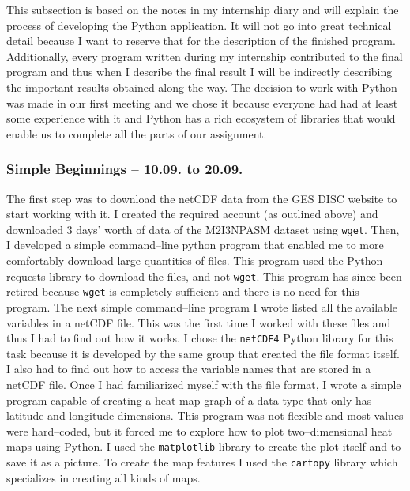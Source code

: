 \documentclass[../00_main.tex]{subfiles}
\begin{document}
This subsection is based on the notes in my internship diary and will explain
the process of developing the Python application. It will not go into great
technical detail because I want to reserve that for the description of the
finished program. Additionally, every program written during my internship
contributed to the final program and thus when I describe the final result
I will be indirectly describing the important results obtained along the way. 
The decision to work with
Python was made in our first meeting and we chose it because everyone had had
at least some experience with it and Python has a rich ecosystem of libraries
that would enable us to complete all the parts of our assignment.\newline

\subsubsection{Simple Beginnings -- 10.09. to 20.09.}

The first step was to download the netCDF data from the GES DISC website to
start working with it. I created the required account (as outlined above) and 
downloaded 3 days' worth of data of the M2I3NPASM dataset using \texttt{wget}.
Then, I developed a simple command--line python program that enabled me to more
comfortably download large quantities of files. This program used the Python
requests \cite{py-requests} library to download the files, and not \texttt{wget}. This program has
since been retired because \texttt{wget} is completely sufficient and there is
no need for this program. \newline
The next simple command--line program I wrote listed all the available variables
in a netCDF file. This was the first time I worked with these files and thus
I had to find out how it works. I chose the \texttt{netCDF4} Python library
\cite{netcdf4} for
this task because it is developed by the same group that created the file
format itself. I also had to find out how to access the variable names that are
stored in a netCDF file.\newline
Once I had familiarized myself with the file format, I wrote a simple program 
capable of creating a heat map graph of a data type that only has latitude and
longitude dimensions. This program was not flexible and most values were
hard--coded, but it forced me to explore how to plot two--dimensional heat maps
using Python. I used the \texttt{matplotlib} library \cite{py-mpl} to create the plot itself
and to save it as a picture. To create the map features I used the
\texttt{cartopy} library \cite{py-cartopy} which specializes in creating all kinds of maps.
\end{document}
